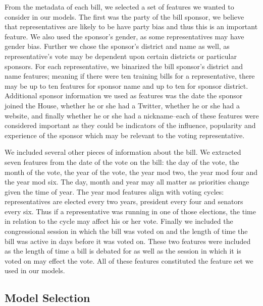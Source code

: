 \documentclass[11pt,letterpaper,twocolumn]{article}
\begin{document}
	From the metadata of each bill, we selected a set of features we wanted to consider in our models. The first was the party of the bill sponsor, we believe that representatives are likely to be have party bias and thus this is an important feature. We also used the sponsor's gender, as some representatives may have gender bias. Further we chose the sponsor's district and name as well, as representative's vote may be dependent upon certain districts or particular sponsors. For each representative, we binarized the bill sponsor's district and name features; meaning if there were ten training bills for a representative, there may be up to ten features for sponsor name and up to ten for sponsor district. Additional sponsor information we used as features was the date the sponsor joined the House, whether he or she had a Twitter, whether he or she had a website, and finally whether he or she had a nickname--each of these features were considered important as they could be indicators of the influence, popularity and experience of the sponsor which may be relevant to the voting representative.
	
	We included several other pieces of information about the bill. We extracted seven features from the date of the vote on the bill: the day of the vote, the month of the vote, the year of the vote, the year mod two, the year mod four and the year mod six. The day, month and year may all matter as priorities change given the time of year. The year mod features align with voting cycles: representatives are elected every two years, president every four and senators every six. Thus if a representative was running in one of those elections, the time in relation to the cycle may affect his or her vote. Finally we included the congressional session in which the bill was voted on and the length of time the bill was active in days before it was voted on. These two features were included as the length of time a bill is debated for as well as the session in which it is voted on may effect the vote. All of these features constituted the feature set we used in our models.

\subsection{Model Selection}
\end{document}
